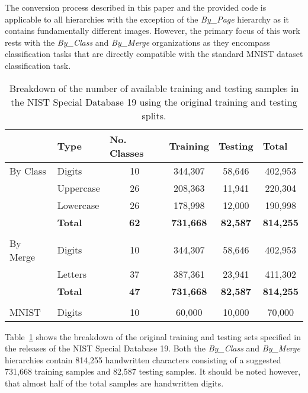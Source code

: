 \documentclass[conference]{IEEEtran}
\begin{document}
The conversion process described in this paper and the provided code is applicable to all hierarchies with the exception of the \textit{By\_Page} hierarchy as it contains fundamentally different images. However, the primary focus of this work rests with the \textit{By\_Class} and \textit{By\_Merge} organizations as they encompass classification tasks that are directly compatible with the standard MNIST dataset classification task. 

\begin{table}[]
\centering
\caption{Breakdown of the number of available training and testing samples in the NIST Special Database 19 using the original training and testing splits.}
\label{tab:dataset-composition}
\begin{tabular}{@{}llcccc@{}}
\toprule
 & Type & \multicolumn{1}{l}{No. Classes} & \multicolumn{1}{l}{Training} & \multicolumn{1}{l}{Testing} & \multicolumn{1}{l}{Total} \\ \midrule
By Class & Digits & 10 & 344,307 & 58,646 & 402,953 \\
 & Uppercase & 26 & 208,363 & 11,941 & 220,304 \\
 & Lowercase & 26 & 178,998 & 12,000 & 190,998 \\
 & \textbf{Total} & \textbf{62} & \textbf{731,668} & \textbf{82,587} & \textbf{814,255} \\
 &  & \multicolumn{1}{l}{} & \multicolumn{1}{l}{} & \multicolumn{1}{l}{} & \multicolumn{1}{l}{} \\
By Merge & Digits & 10 & 344,307 & 58,646 & 402,953 \\
 & Letters & 37 & 387,361 & 23,941 & 411,302 \\
 & \textbf{Total} & \textbf{47} & \textbf{731,668} & \textbf{82,587} & \textbf{814,255} \\
 &  & \multicolumn{1}{l}{} & \multicolumn{1}{l}{} & \multicolumn{1}{l}{} & \multicolumn{1}{l}{} \\
MNIST \cite{LeCun1998} & Digits & 10 & 60,000 & 10,000 & 70,000 \\ \bottomrule
\end{tabular}
\end{table}

Table~\ref{tab:dataset-composition} shows the breakdown of the original training and testing sets specified in the releases of the NIST Special Database 19. Both the \textit{By\_Class} and \textit{By\_Merge} hierarchies contain 814,255 handwritten characters consisting of a suggested 731,668 training samples and 82,587 testing samples. It should be noted however, that almost half of the total samples are handwritten digits. 
\end{document}
